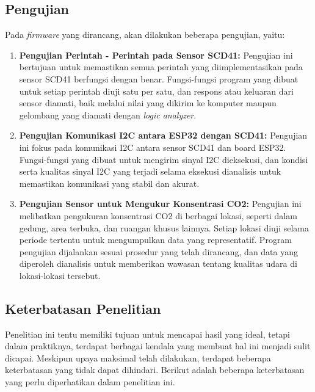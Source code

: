     \subsection{Pengujian}
    Pada \textit{firmware} yang dirancang, akan dilakukan beberapa pengujian, yaitu: 
        \begin{enumerate}
            \item \textbf{Pengujian Perintah - Perintah pada Sensor SCD41:} Pengujian ini bertujuan untuk memastikan semua perintah yang diimplementasikan pada sensor SCD41 berfungsi dengan benar. Fungsi-fungsi program yang dibuat untuk setiap perintah diuji satu per satu, dan respons atau keluaran dari sensor diamati, baik melalui nilai yang dikirim ke komputer maupun gelombang yang diamati dengan \textit{logic analyzer}.
            
            \item \textbf{Pengujian Komunikasi I2C antara ESP32 dengan SCD41:} Pengujian ini fokus pada komunikasi I2C antara sensor SCD41 dan board ESP32. Fungsi-fungsi yang dibuat untuk mengirim sinyal I2C dieksekusi, dan kondisi serta kualitas sinyal I2C yang terjadi selama eksekusi dianalisis untuk memastikan komunikasi yang stabil dan akurat.
            
            \item \textbf{Pengujian Sensor untuk Mengukur Konsentrasi CO2:} Pengujian ini melibatkan pengukuran konsentrasi CO2 di berbagai lokasi, seperti dalam gedung, area terbuka, dan ruangan khusus lainnya. Setiap lokasi diuji selama periode tertentu untuk mengumpulkan data yang representatif. Program pengujian dijalankan sesuai prosedur yang telah dirancang, dan data yang diperoleh dianalisis untuk memberikan wawasan tentang kualitas udara di lokasi-lokasi tersebut.

        \end{enumerate}

    \subsection{Keterbatasan Penelitian}

    Penelitian ini tentu memiliki tujuan untuk mencapai hasil yang ideal, tetapi dalam praktiknya, terdapat berbagai kendala yang membuat hal ini menjadi sulit dicapai. Meskipun upaya maksimal telah dilakukan, terdapat beberapa keterbatasan yang tidak dapat dihindari. Berikut adalah beberapa keterbatasan yang perlu diperhatikan dalam penelitian ini. 
    
